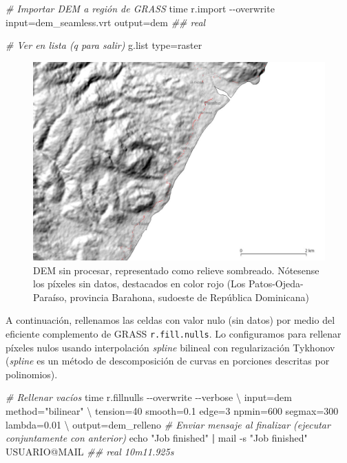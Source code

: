 \documentclass[spanish]{article}
\newenvironment{Shaded}{\begin{snugshade}}{\end{snugshade}}
\newcommand{\AttributeTok}[1]{\textcolor[rgb]{0.77,0.63,0.00}{#1}}
\newcommand{\BuiltInTok}[1]{#1}
\newcommand{\CommentTok}[1]{\textcolor[rgb]{0.56,0.35,0.01}{\textit{#1}}}
\newcommand{\DataTypeTok}[1]{\textcolor[rgb]{0.13,0.29,0.53}{#1}}
\newcommand{\ExtensionTok}[1]{#1}
\newcommand{\KeywordTok}[1]{\textcolor[rgb]{0.13,0.29,0.53}{\textbf{#1}}}
\newcommand{\NormalTok}[1]{#1}
\newcommand{\StringTok}[1]{\textcolor[rgb]{0.31,0.60,0.02}{#1}}
\begin{document}
\begin{Shaded}
\begin{Highlighting}[]
\CommentTok{\# Importar DEM a región de GRASS}
\BuiltInTok{time}\NormalTok{ r.import }\AttributeTok{{-}{-}overwrite}\NormalTok{ input=dem\_seamless.vrt output=dem}
\CommentTok{\#\# real }

\CommentTok{\# Ver en lista (q para salir)}
\ExtensionTok{g.list}\NormalTok{ type=raster}
\end{Highlighting}
\end{Shaded}

\begin{figure}

{\centering \includegraphics[width=0.8\linewidth]{figuras/dem-sin-procesar} 

}

\caption{DEM sin procesar, representado como relieve sombreado. Nótesense los píxeles sin datos, destacados en color rojo (Los Patos-Ojeda-Paraíso, provincia Barahona, sudoeste de República Dominicana)}\label{fig:demsinprocesar}
\end{figure}

A continuación, rellenamos las celdas con valor nulo (sin datos) por
medio del eficiente complemento de GRASS \texttt{r.fill.nulls}. Lo
configuramos para rellenar píxeles nulos usando interpolación
\emph{spline} bilineal con regularización Tykhonov (\emph{spline} es un
método de descomposición de curvas en porciones descritas por
polinomios).

\begin{Shaded}
\begin{Highlighting}[]
\CommentTok{\# Rellenar vacíos}
\BuiltInTok{time}\NormalTok{ r.fillnulls }\AttributeTok{{-}{-}overwrite} \AttributeTok{{-}{-}verbose} \DataTypeTok{\textbackslash{}}
\NormalTok{  input=dem method=}\StringTok{"bilinear"} \DataTypeTok{\textbackslash{}}
\NormalTok{  tension=40 smooth=0.1 edge=3 npmin=600 segmax=300 lambda=0.01 }\DataTypeTok{\textbackslash{}}
\NormalTok{  output=dem\_relleno}
\CommentTok{\# Enviar mensaje al finalizar (ejecutar conjuntamente con anterior)}
\BuiltInTok{echo} \StringTok{"Job finished"} \KeywordTok{|} \ExtensionTok{mail} \AttributeTok{{-}s} \StringTok{"Job finished"}\NormalTok{ USUARIO@MAIL}
\CommentTok{\#\# real 10m11.925s}
\end{Highlighting}
\end{Shaded}
\end{document}
